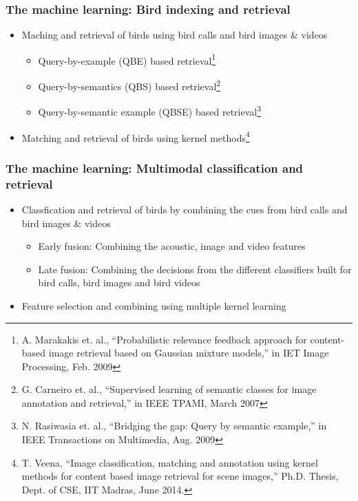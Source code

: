 \documentclass[mathserif]{beamer}
\begin{document}
\begin{frame}
\frametitle{The machine learning: Bird indexing and retrieval}
\begin{itemize}
\item<2-> Maching and retrieval of birds using bird calls and bird images \& videos
\begin{itemize}
      \item Query-by-example (QBE) based retrieval\footnote{
	A. Marakakis et. al., “Probabilistic relevance feedback approach for content-based image retrieval based on Gaussian mixture models,” in IET Image Processing, Feb. 2009}
      \item Query-by-semantics (QBS) based retrieval\footnote{
	G. Carneiro et. al., “Supervised learning of semantic classes for image annotation and retrieval,” in IEEE TPAMI, March 2007}
      \item Query-by-semantic example (QBSE) based retrieval\footnote{
	N. Rasiwasia et. al., “Bridging the gap: Query by semantic example,” in IEEE Transactions on Multimedia, Aug. 2009}
\end{itemize}
\item<3-> Matching and retrieval of birds using kernel methods\footnote{
	T. Veena, “Image classification, matching and annotation using kernel methods for content based image retrieval for scene images,” Ph.D. Thesis, Dept. of CSE, IIT Madras, June 2014.}   
\end{itemize}
\end{frame}

\begin{frame}
\frametitle{The machine learning: Multimodal classification and retrieval}
\begin{itemize}
\item<2-> Classfication and retrieval of birds by combining the cues from bird calls and bird images \& videos
\begin{itemize}
      \item Early fusion: Combining the acoustic, image and video features
      \item Late fusion: Combining the decisions from the different classifiers built for bird calls, bird images and bird videos
 \end{itemize}
\item<3-> Feature selection and combining using multiple kernel learning
\end{itemize}
\end{frame}
\end{document}
